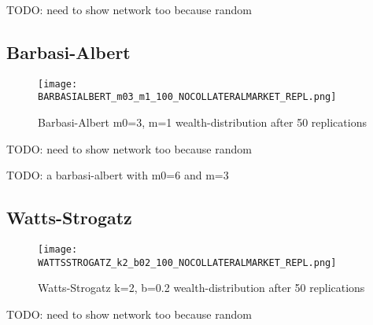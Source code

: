 \documentclass[Bachelorarbeit.tex]{subfiles}
\begin{document}
TODO: need to show network too because random

\subsection{Barbasi-Albert}
\begin{figure}[!htbp]
	\centering
  \texttt{[image: BARBASIALBERT\_m03\_m1\_100\_NOCOLLATERALMARKET\_REPL.png]}
	\caption{Barbasi-Albert m0=3, m=1 wealth-distribution after 50 replications}
	\label{fig1}
\end{figure}

TODO: need to show network too because random

TODO: a barbasi-albert with m0=6 and m=3

\subsection{Watts-Strogatz}
\begin{figure}[!htbp]
	\centering
  \texttt{[image: WATTSSTROGATZ\_k2\_b02\_100\_NOCOLLATERALMARKET\_REPL.png]}
	\caption{Watts-Strogatz k=2, b=0.2 wealth-distribution after 50 replications}
	\label{fig1}
\end{figure}

TODO: need to show network too because random
\end{document}
